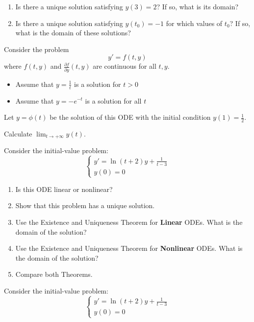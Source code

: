 \begin{exercises}
\begin{problist}
		
		\begin{enumerate}
		\item Is there a unique solution satisfying $y(3)=2$? If so, what is its domain?
		
		\item Is there a unique solution satisfying $y(t_0)=-1$ for which values of $t_0$? If so, what is the domain of these solutions?
		\end{enumerate}

	
	
	\prob Consider the problem
		$$
		y' = f(t,y)
		$$
		where $f(t,y)$ and $\frac{\partial f}{\partial y}(t,y)$ are continuous for all $t,y$.
		\begin{itemize}
		\item Assume that $y=\frac{1}{t}$ is a solution for $t>0$
		\item Assume that $y = -e^{-t}$ is a solution for all $t$
		\end{itemize}
		
		Let $y=\phi(t)$ be the solution of this ODE with the initial condition $y(1) = \frac12$.
		
		Calculate $\displaystyle \lim_{t \to +\infty} y(t)$.



	\prob Consider the initial-value problem:
		$$ 
		\begin{cases}
			y' = \ln(t+2) y + \frac{1}{t-3} \\
			y(0)=0
		\end{cases}
		$$
		
		\begin{enumerate}
			\item Is this ODE linear or nonlinear?
			\item Show that this problem has a unique solution.
			\item Use the Existence and Uniqueness Theorem for \textbf{Linear} ODEs. What is the domain of the solution?
			\item Use the Existence and Uniqueness Theorem for \textbf{Nonlinear} ODEs. What is the domain of the solution?
			\item Compare both Theorems.
		\end{enumerate}




	\prob Consider the initial-value problem:
		$$ 
		\begin{cases}
			y' = \ln(t+2) y + \frac{1}{t-3} \\
			y(0)=0
		\end{cases}
		$$
		

\end{problist}
\end{exercises}
